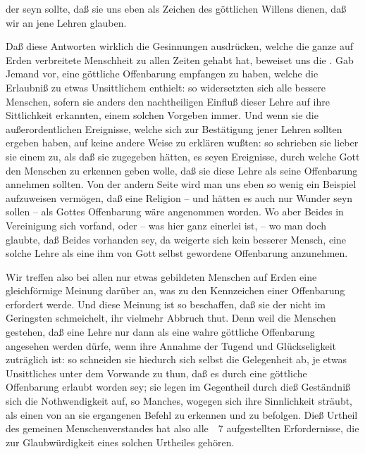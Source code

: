 \begin{aufza}
der seyn sollte, daß sie uns eben als Zeichen des göttlichen Willens dienen, daß wir an jene Lehren glauben.
\item Daß diese Antworten wirklich die Gesinnungen ausdrücken, welche die ganze auf Erden verbreitete Menschheit zu allen Zeiten gehabt hat, beweiset uns die . Gab Jemand vor, eine göttliche Offenbarung empfangen zu haben, welche die Erlaubniß zu etwas Unsittlichem enthielt: so widersetzten sich alle bessere Menschen, sofern sie anders den nachtheiligen Einfluß dieser Lehre auf ihre Sittlichkeit erkannten, einem solchen Vorgeben immer. Und wenn sie die außerordentlichen Ereignisse, welche sich zur Bestätigung jener Lehren sollten ergeben haben, auf keine andere Weise zu erklären wußten: so schrieben sie lieber sie einem  zu, als daß sie zugegeben hätten, es seyen Ereignisse, durch welche Gott den Menschen zu erkennen geben wolle, daß sie diese Lehre als seine Offenbarung annehmen sollten. Von der andern Seite wird man uns eben so wenig ein Beispiel aufzuweisen vermögen, daß eine Religion  -- und hätten es auch nur  Wunder seyn sollen -- als Gottes Offenbarung wäre angenommen worden. Wo aber Beides in Vereinigung sich vorfand, oder -- was hier ganz einerlei ist, -- wo man doch glaubte, daß Beides vorhanden sey, da weigerte sich kein besserer Mensch, eine solche Lehre als eine ihm von Gott selbst gewordene Offenbarung anzunehmen.
\item Wir treffen also bei allen nur etwas gebildeten Menschen auf Erden eine gleichförmige Meinung darüber an, was zu den Kennzeichen einer Offenbarung erfordert werde. Und diese Meinung ist so beschaffen, daß sie der  nicht im Geringsten schmeichelt, ihr vielmehr Abbruch thut. Denn weil die Menschen gestehen, daß eine Lehre nur dann als eine wahre göttliche Offenbarung angesehen werden dürfe, wenn ihre Annahme der Tugend und Glückseligkeit zuträglich ist: so schneiden sie hiedurch sich selbst die Gelegenheit ab, je etwas Unsittliches unter dem Vorwande zu thun, daß es durch eine göttliche Offenbarung erlaubt worden sey; sie legen im Gegentheil durch dieß Geständniß sich die Nothwendigkeit auf, so Manches, wogegen sich ihre Sinnlichkeit sträubt, als einen von  an sie ergangenen Befehl zu erkennen und zu befolgen. Dieß Urtheil des gemeinen Menschenverstandes hat also alle \ \no\,7 aufgestellten Erfordernisse, die zur Glaubwürdigkeit eines solchen Urtheiles gehören.
\end{aufza}
   
